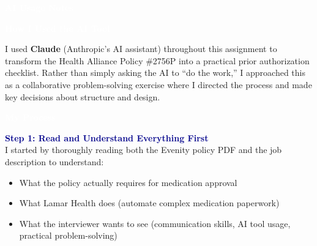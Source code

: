\documentclass[11pt,letterpaper]{article}
\newcommand{\checkbox}{\tikz[baseline=-0.5ex]\draw[line width=0.8pt] (0,0) rectangle (0.3,0.3);\hspace{0.2em}}
\newcommand{\sectionheader}[1]{
    \vspace{0.4cm}
    \noindent
    \colorbox{primaryblue}{
        \parbox{\dimexpr\textwidth-2\fboxsep}{
            \textcolor{white}{\Large\bfseries\sffamily #1}
        }
    }
    \vspace{0.3cm}
}
\begin{document}
\noindent
{}

\newpage


\vspace{0.3cm}

\begin{center}
    \textcolor{white}{\LARGE\bfseries\sffamily AI Usage Notes}
\end{center}

\vspace{0.5cm}

\sectionheader{How I Used the AI Tool}

I used \textbf{Claude} (Anthropic's AI assistant) throughout this assignment to transform the Health Alliance Policy \#2756P into a practical prior authorization checklist. Rather than simply asking the AI to ``do the work,'' I approached this as a collaborative problem-solving exercise where I directed the process and made key decisions about structure and design.

\sectionheader{My Process}

\textcolor{darkblue}{\bfseries\large Step 1: Read and Understand Everything First}\\[0.1cm]
I started by thoroughly reading both the Evenity policy PDF and the job description to understand:
\begin{itemize}
    \item What the policy actually requires for medication approval
    \item What Lamar Health does (automate complex medication paperwork)
    \item What the interviewer wants to see (communication skills, AI tool usage, practical problem-solving)
\end{itemize}
\end{document}
